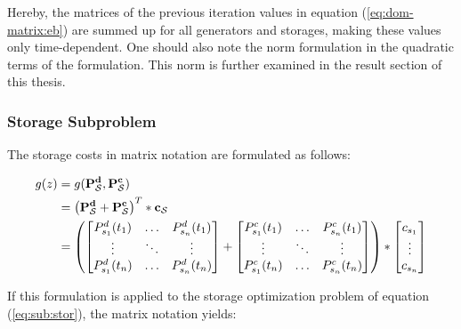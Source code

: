 Hereby, the matrices of the previous iteration values in equation (\ref{eq:dom-matrix:eb}) are summed up for all generators and storages, making these values only time-dependent. One should also note the norm formulation in the quadratic terms of the formulation. This norm is further examined in the result section of this thesis.

\subsubsection*{Storage Subproblem}

The storage costs in matrix notation are formulated as follows:

\begin{subequations}
	\begin{align}
		g(z) &= g(\vb{P_\mathcal{S}^d}, \vb{P_\mathcal{S}^c})\\
		& = \left(\vb{P_\mathcal{S}^d} + \vb{P_\mathcal{S}^c}\right)^T * \vb{c_\mathcal{S}} \\
		& = \left(\begin{bmatrix}
			P_{s_1}^d(t_1) & \dots & P_{s_n}^d(t_1) \\
			\vdots & \ddots & \vdots \\
			P_{s_1}^d(t_n) & \dots & P_{s_n}^d(t_n)
		\end{bmatrix} + \begin{bmatrix}
			P_{s_1}^c(t_1) & \dots & P_{s_n}^c(t_1) \\
			\vdots & \ddots & \vdots \\
			P_{s_1}^c(t_n) & \dots & P_{s_n}^c(t_n)
		\end{bmatrix} \right) * \begin{bmatrix}
			c_{s_1} \\
			\vdots \\
			c_{s_n}
		\end{bmatrix}
	\end{align}
\end{subequations}

If this formulation is applied to the storage optimization problem of equation (\ref{eq:sub:stor}), the matrix notation yields:

